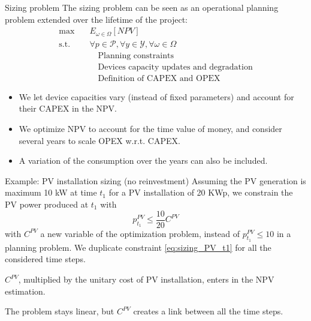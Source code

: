 \begin{frame}[allowframebreaks]{Sizing problem}
The sizing problem can be seen as an operational planning problem extended over the lifetime of the project:
\begin{align*}
    \max \quad & E_{\omega \in \Omega} [NPV] \\
    \text{s.t.} \quad & \forall p \in \mathcal{P}, \forall y \in \mathcal{Y}, \forall \omega \in \Omega \\
                 & \quad \text{Planning constraints}  \\
                 & \quad \text{Devices capacity updates and degradation}\\
                 & \quad \text{Definition of CAPEX and OPEX}
\end{align*}
\begin{itemize}
  \item We let device capacities vary (instead of fixed parameters) and account for their CAPEX in the NPV.
  \item We optimize NPV to account for the time value of money, and consider several years to scale OPEX w.r.t. CAPEX.
  \item A variation of the consumption over the years can also be included.
\end{itemize}

\begin{block}{Example: PV installation sizing (no reinvestment)}
Assuming the PV generation is maximum 10 kW at time $t_1$ for a PV installation of 20 KWp, we constrain the PV power produced at $t_1$ with 
\begin{equation}
    p^{PV}_{t_1} \leq \frac{10}{20} C^{PV} \label{eq:sizing_PV_t1}
\end{equation} with $C^{PV}$ a new variable of the optimization problem, instead of 
$p^{PV}_{t_1} \leq 10$ in a planning problem. We duplicate constraint \eqref{eq:sizing_PV_t1} for all the considered time steps.

$C^{PV}$, multiplied by the unitary cost of PV installation, enters in the NPV estimation.

The problem stays linear, but $C^{PV}$ creates a link between all the time steps.
\end{block}
    
\end{frame}

